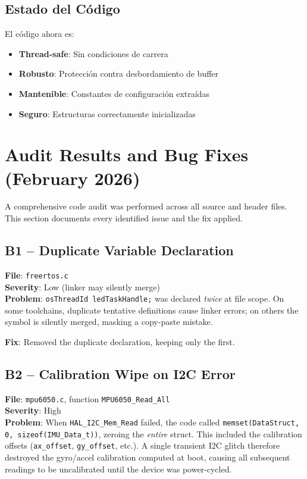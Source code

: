 \documentclass[11pt,a4paper]{article}
\begin{document}
\subsection{Estado del Código}

El código ahora es:
\begin{itemize}
    \item \textbf{Thread-safe}: Sin condiciones de carrera
    \item \textbf{Robusto}: Protección contra desbordamiento de buffer
    \item \textbf{Mantenible}: Constantes de configuración extraídas
    \item \textbf{Seguro}: Estructuras correctamente inicializadas
\end{itemize}

\newpage
\section{Audit Results and Bug Fixes (February 2026)}

A comprehensive code audit was performed across all source and header files.
This section documents every identified issue and the fix applied.

\subsection{B1 -- Duplicate Variable Declaration}

\textbf{File}: \texttt{freertos.c} \\
\textbf{Severity}: Low (linker may silently merge) \\
\textbf{Problem}: \texttt{osThreadId ledTaskHandle;} was declared \emph{twice} at file scope.
On some toolchains, duplicate tentative definitions cause linker errors; on others the
symbol is silently merged, masking a copy-paste mistake.

\textbf{Fix}: Removed the duplicate declaration, keeping only the first.

\subsection{B2 -- Calibration Wipe on I2C Error}

\textbf{File}: \texttt{mpu6050.c}, function \texttt{MPU6050\_Read\_All} \\
\textbf{Severity}: High \\
\textbf{Problem}: When \texttt{HAL\_I2C\_Mem\_Read} failed, the code called
\texttt{memset(DataStruct, 0, sizeof(IMU\_Data\_t))}, zeroing the \emph{entire} struct.
This included the calibration offsets (\texttt{ax\_offset}, \texttt{gy\_offset}, etc.).
A single transient I2C glitch therefore destroyed the gyro/accel calibration computed at
boot, causing all subsequent readings to be uncalibrated until the device was power-cycled.
\end{document}
